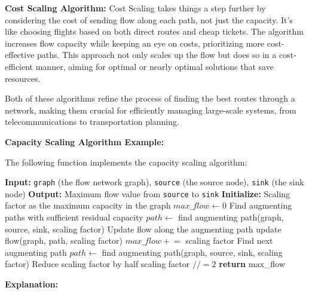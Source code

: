 \documentclass[12pt]{book} %
\begin{document}
\textbf{Cost Scaling Algorithm:}
Cost Scaling takes things a step further by considering the cost of sending flow along each path, not just the capacity. It's like choosing flights based on both direct routes and cheap tickets. The algorithm increases flow capacity while keeping an eye on costs, prioritizing more cost-effective paths. This approach not only scales up the flow but does so in a cost-efficient manner, aiming for optimal or nearly optimal solutions that save resources.

Both of these algorithms refine the process of finding the best routes through a network, making them crucial for efficiently managing large-scale systems, from telecommunications to transportation planning.


\textbf{Capacity Scaling Algorithm Example:}


The following function implements the capacity scaling algorithm:
\FloatBarrier
\begin{algorithm}
\caption{Capacity Scaling}\label{capacity-scaling}
\begin{algorithmic}[1]
    \State \textbf{Input:} \texttt{graph} (the flow network graph), \texttt{source} (the source node), \texttt{sink} (the sink node)
    \State \textbf{Output:} Maximum flow value from \texttt{source} to \texttt{sink}
    \State \textbf{Initialize:} Scaling factor as the maximum capacity in the graph
    \State $max\_flow \gets 0$
        \State Find augmenting paths with sufficient residual capacity
        \State $path \gets$ find augmenting path(graph, source, sink, scaling factor)
            \State Update flow along the augmenting path
            \State update flow(graph, path, scaling factor)
            \State $max\_flow \mathrel{+}= $ scaling factor
            \State Find next augmenting path
            \State $path \gets$ find augmenting path(graph, source, sink, scaling factor)
        \EndWhile
        \State Reduce scaling factor by half
        \State scaling factor $\mathrel{//=} 2$
    \EndWhile
    \State \textbf{return} max\_flow
\EndProcedure
\end{algorithmic}
\end{algorithm}
\FloatBarrier
\textbf{Explanation:}
\end{document}
